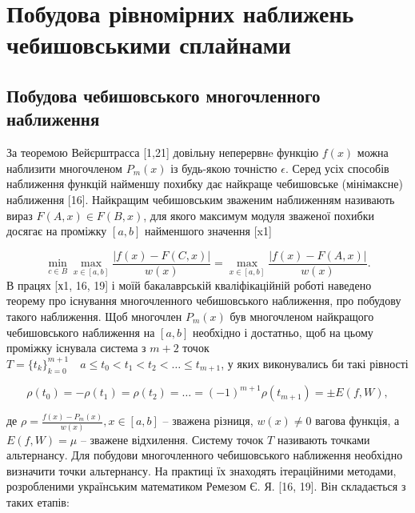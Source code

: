 \documentclass[ukrainian,14pt]{extarticle}
\begin{document}
\newpage


\section{Побудова рівномірних наближень чебишовськими сплайнами}
\subsection{Побудова чебишовського многочленного наближення}
За теоремою Вейєрштрасса [1,21] довільну неперервнe функцію $f(x)$  можна наблизити многочленом $P_m(x)$ із будь-якою точністю $\epsilon$. Серед усіх способів наближення функцій найменшу похибку дає найкраще чебишовське (мінімаксне) наближення [16]. Найкращим чебишовським зваженим наближенням називають вираз $F(A, x) \in F(B, x)$, для якого максимум модуля зваженої похибки досягає на проміжку $[a, b]$ найменшого значення [x1]

\begin{equation}\label{eq:formula1}
    \min_{c \in B} \max_{x \in [a,b]} \frac{|f(x) - F(C,x)|}{w(x)} = \max_{x \in [a,b]} \frac{|f(x) - F(A,x)|}{w(x)}.
\end{equation}
В працях [х1, 16, 19] і моїй бакалаврській кваліфікаційній роботі наведено теорему про існування многочленного чебишовського наближення, про побудову такого наближення. Щоб многочлен $P_m(x)$ був многочленом найкращого чебишовського наближення на $[a, b]$ необхідно і достатньо, щоб на цьому проміжку існувала система з $m+2$ точок $T=\{t_k\}_{k=0}^{m+1} \quad a \leq t_0 < t_1 < t_2 < \ldots \leq t_{m+1}$, у яких виконувались би такі рівності

\begin{equation}\label{eq:formula2}
    \rho(t_0) = -\rho(t_1) = \rho(t_2) = \ldots = (-1)^{m+1}\rho(t_{m+1}) = \pm E(f,W),
\end{equation}

де $\rho = \frac{f(x) - P_m(x)}{w(x)}, x \in [a, b]$  – зважена різниця, $w(x) \neq 0$ вагова функція, а $E(f,W) = \mu$ – зважене відхилення. Систему точок $T$ називають точками альтернансу. Для побудови многочленного чебишовського наближення необхідно визначити точки альтернансу. На практиці їх знаходять ітераційними методами, розробленими українським математиком Ремезом Є. Я. [16, 19]. Він складається з таких етапів:
\end{document}
